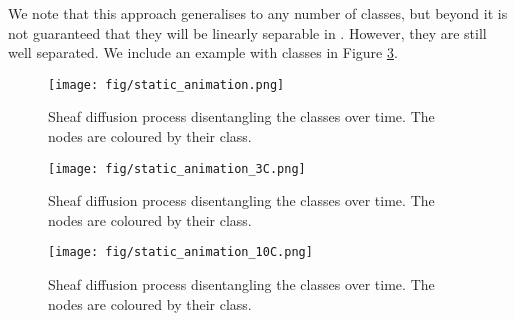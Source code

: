 \documentclass{article}
\begin{document}
We note that this approach generalises to any number of classes, but beyond  it is not guaranteed that they will be linearly separable in . However, they are still well separated. We include an example with  classes in Figure \ref{fig:sheaf_diffusion_10C}.  

\begin{figure}[h]
    \centering
    \texttt{[image: fig/static\_animation.png]}
    \caption{Sheaf diffusion process disentangling the  classes over time. The nodes are coloured by their class.}
    \label{fig:sheaf_diffusion_4C}
\end{figure}

\begin{figure}[h]
    \centering
    \texttt{[image: fig/static\_animation\_3C.png]}
    \caption{Sheaf diffusion process disentangling the  classes over time. The nodes are coloured by their class.}
    \label{fig:sheaf_diffusion_3C}
\end{figure}

\begin{figure}[h]
    \centering
    \texttt{[image: fig/static\_animation\_10C.png]}
    \caption{Sheaf diffusion process disentangling the  classes over time. The nodes are coloured by their class.}
    \label{fig:sheaf_diffusion_10C}
\end{figure}
\end{document}

